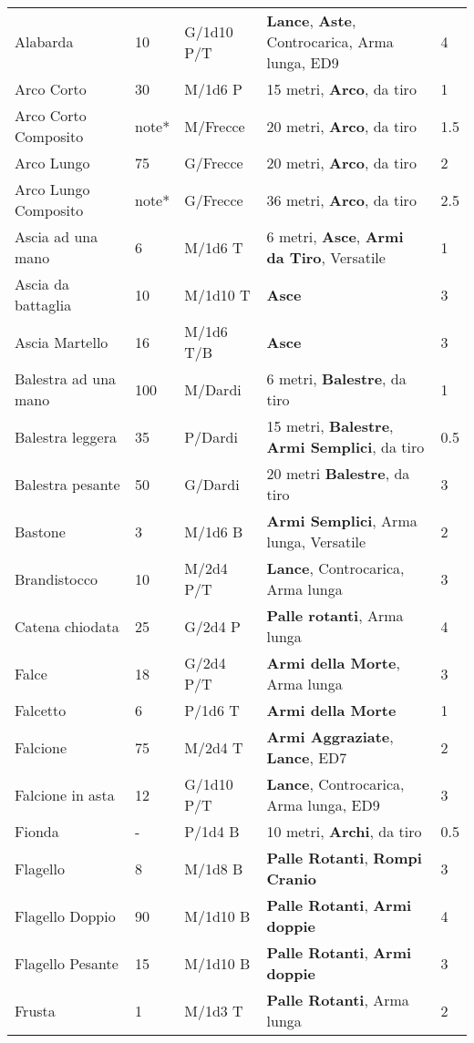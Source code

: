 \documentclass[a4paper,12 pt,openany]{book}
\begin{document}
\begin{textblock*}{19.5cm}
\begin{tabular}{lllll}
Alabarda& 10 & G/1d10 P/T& \textbf{Lance}, \textbf{Aste}, Controcarica, Arma lunga, ED9 & 4\\
Arco Corto& 30 & M/1d6 P& 15 metri, \textbf{Arco}, da tiro& 1\\
Arco Corto Composito& note*& M/Frecce& 20 metri, \textbf{Arco}, da tiro& 1.5\\
Arco Lungo& 75 & G/Frecce& 20 metri, \textbf{Arco}, da tiro& 2\\
Arco Lungo Composito& note*& G/Frecce& 36 metri, \textbf{Arco}, da tiro& 2.5\\
Ascia ad una mano& 6  & M/1d6 T& 6 metri, \textbf{Asce}, \textbf{Armi da Tiro}, Versatile& 1\\
Ascia da battaglia& 10 & M/1d10 T&\textbf{Asce}& 3\\
Ascia Martello& 16 & M/1d6 T/B& \textbf{Asce}& 3\\
Balestra ad una mano& 100& M/Dardi& 6 metri, \textbf{Balestre}, da tiro& 1\\
Balestra leggera& 35 & P/Dardi& 15 metri, \textbf{Balestre}, \textbf{Armi Semplici}, da tiro& 0.5\\
Balestra pesante& 50 & G/Dardi& 20 metri \textbf{Balestre}, da tiro& 3\\
Bastone& 3& M/1d6 B& \textbf{Armi Semplici}, Arma lunga, Versatile& 2\\
Brandistocco& 10 & M/2d4 P/T& \textbf{Lance}, Controcarica, Arma lunga& 3\\
Catena chiodata& 25 & G/2d4 P& \textbf{Palle rotanti}, Arma lunga& 4\\
Falce& 18 & G/2d4 P/T& \textbf{Armi della Morte}, Arma lunga& 3\\
Falcetto& 6& P/1d6 T& \textbf{Armi della Morte} & 1\\
Falcione& 75 & M/2d4 T& \textbf{Armi Aggraziate}, \textbf{Lance}, ED7& 2\\
Falcione in asta& 12 & G/1d10 P/T& \textbf{Lance}, Controcarica, Arma lunga, ED9& 3\\
Fionda& -& P/1d4 B& 10 metri, \textbf{Archi}, da tiro& 0.5\\
Flagello& 8& M/1d8 B& \textbf{Palle Rotanti}, \textbf{Rompi Cranio}& 3\\
Flagello Doppio& 90 & M/1d10 B& \textbf{Palle Rotanti}, \textbf{Armi doppie} & 4\\
Flagello Pesante& 15 & M/1d10 B& \textbf{Palle Rotanti}, \textbf{Armi doppie}& 3\\
Frusta& 1& M/1d3 T& \textbf{Palle Rotanti}, Arma lunga& 2\\

\end{tabular}
\end{textblock*}
\end{document}
